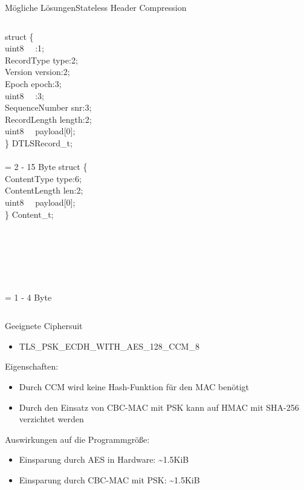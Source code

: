 \documentclass{beamer}
\begin{document}
\begin{frame}{Mögliche Lösungen}{Stateless Header Compression}
  \begin{columns}
      struct \{\\
      \qquad uint8 ~~:1;\\
      \qquad RecordType type:2;\\
      \qquad Version version:2;\\
      \qquad Epoch epoch:3;\\
      \qquad uint8 ~~:3;\\
      \qquad SequenceNumber snr:3;\\
      \qquad RecordLength length:2;\\
      \qquad uint8 ~~payload[0];\\
      \} DTLSRecord\_t;\\
      ~\\
      = 2 - 15 Byte
      struct \{\\
      \qquad ContentType type:6;\\
      \qquad ContentLength len:2;\\
      \qquad uint8 ~~payload[0];\\
      \} Content\_t;\\
      ~\\
      ~\\
      ~\\
      ~\\
      ~\\
      ~\\
      = 1 - 4 Byte
  \end{columns}
\end{frame}

\begin{frame}{Geeignete Ciphersuit}
  \begin{itemize}
    \item TLS\_PSK\_ECDH\_WITH\_AES\_128\_CCM\_8
  \end{itemize}
  Eigenschaften:
  \begin{itemize}
    \item Durch CCM wird keine Hash-Funktion \newline für den MAC benötigt
    \item Durch den Einsatz von CBC-MAC mit PSK kann \newline auf HMAC mit SHA-256 verzichtet werden
  \end{itemize}
  Auswirkungen auf die Programmgröße:
  \begin{itemize}
    \item Einsparung durch AES in Hardware: \textasciitilde 1.5KiB
    \item Einsparung durch CBC-MAC mit PSK: \textasciitilde 1.5KiB
  \end{itemize}
\end{frame}
\end{document}
